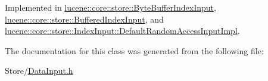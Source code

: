 Implemented in \mbox{\hyperlink{classlucene_1_1core_1_1store_1_1ByteBufferIndexInput_a7d3a10f0f6a68cc86d6737d457d4d45f}{lucene\+::core\+::store\+::\+Byte\+Buffer\+Index\+Input}}, \mbox{\hyperlink{classlucene_1_1core_1_1store_1_1BufferedIndexInput_a500b3dc2413232d351407e84678724c6}{lucene\+::core\+::store\+::\+Buffered\+Index\+Input}}, and \mbox{\hyperlink{classlucene_1_1core_1_1store_1_1IndexInput_1_1DefaultRandomAccessInputImpl_ab3a8ff022f56c0c13143287089500ac4}{lucene\+::core\+::store\+::\+Index\+Input\+::\+Default\+Random\+Access\+Input\+Impl}}.



The documentation for this class was generated from the following file\+:\begin{DoxyCompactItemize}
\item 
Store/\mbox{\hyperlink{DataInput_8h}{Data\+Input.\+h}}\end{DoxyCompactItemize}
